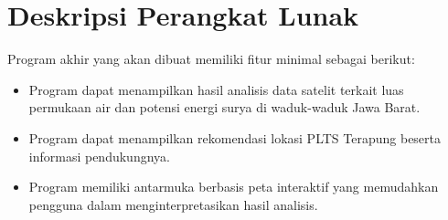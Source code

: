 \documentclass[a4paper,twoside]{article}
\begin{document}
\section{Deskripsi Perangkat Lunak}
Program akhir yang akan dibuat memiliki fitur minimal sebagai berikut:
\begin{itemize}
	\item Program dapat menampilkan hasil analisis data satelit terkait luas permukaan air dan potensi
	      energi surya di waduk-waduk Jawa Barat.
	\item Program dapat menampilkan rekomendasi lokasi PLTS Terapung beserta informasi pendukungnya.
	\item Program memiliki antarmuka berbasis peta interaktif yang memudahkan pengguna dalam
	      menginterpretasikan hasil analisis.
\end{itemize}


\end{document}

